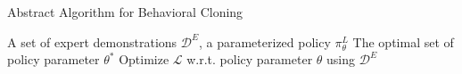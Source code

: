 \begin{algorithm}
\caption{Abstract Algorithm for Behavioral Cloning}\label{alg:bc}
\begin{algorithmic}
\Require A set of expert demonstrations $\mathcal{D}^{E}$, a parameterized policy $\pi_{\theta}^{L}$
\Ensure The optimal set of policy parameter $\theta^{*}$
\State Optimize $\mathcal{L}$ w.r.t. policy parameter $\theta$ using $\mathcal{D}^{E}$
\end{algorithmic}
\end{algorithm}